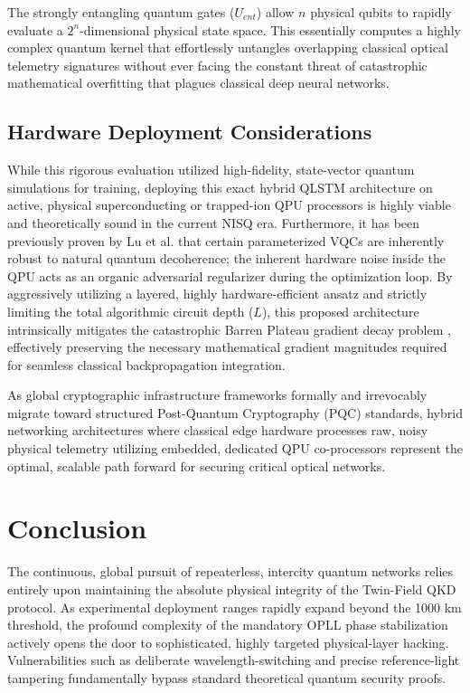 \documentclass[10pt, journal, letterpaper, twocolumn]{IEEEtran}
\begin{document}
The strongly entangling quantum gates ($U_{ent}$) allow $n$ physical qubits to rapidly evaluate a $2^n$-dimensional physical state space. This essentially computes a highly complex quantum kernel that effortlessly untangles overlapping classical optical telemetry signatures without ever facing the constant threat of catastrophic mathematical overfitting that plagues classical deep neural networks.

\subsection{Hardware Deployment Considerations}
While this rigorous evaluation utilized high-fidelity, state-vector quantum simulations for training, deploying this exact hybrid QLSTM architecture on active, physical superconducting or trapped-ion QPU processors is highly viable and theoretically sound in the current NISQ era. Furthermore, it has been previously proven by Lu et al. \cite{lu} that certain parameterized VQCs are inherently robust to natural quantum decoherence; the inherent hardware noise inside the QPU acts as an organic adversarial regularizer during the optimization loop. By aggressively utilizing a layered, highly hardware-efficient ansatz and strictly limiting the total algorithmic circuit depth ($L$), this proposed architecture intrinsically mitigates the catastrophic Barren Plateau gradient decay problem \cite{mcclean}, effectively preserving the necessary mathematical gradient magnitudes required for seamless classical backpropagation integration.

As global cryptographic infrastructure frameworks formally and irrevocably migrate toward structured Post-Quantum Cryptography (PQC) standards, hybrid networking architectures where classical edge hardware processes raw, noisy physical telemetry utilizing embedded, dedicated QPU co-processors represent the optimal, scalable path forward for securing critical optical networks.

\section{Conclusion}
The continuous, global pursuit of repeaterless, intercity quantum networks relies entirely upon maintaining the absolute physical integrity of the Twin-Field QKD protocol. As experimental deployment ranges rapidly expand beyond the 1000 km threshold, the profound complexity of the mandatory OPLL phase stabilization actively opens the door to sophisticated, highly targeted physical-layer hacking. Vulnerabilities such as deliberate wavelength-switching and precise reference-light tampering fundamentally bypass standard theoretical quantum security proofs.
\end{document}
